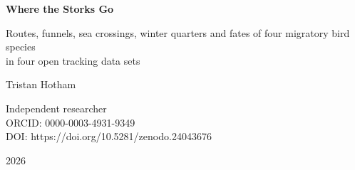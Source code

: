 \documentclass[11pt,a4paper]{article}
\begin{document}
\begin{center}
{\Large\bfseries Where the Storks Go\par}
\vspace{0.4em}
{\large Routes, funnels, sea crossings, winter quarters and fates of four migratory bird species\\in four open tracking data sets\par}
\vspace{1.2em}
{\large Tristan Hotham\par}
\vspace{0.3em}
{\small Independent researcher\\
ORCID: 0000-0003-4931-9349\\
DOI: https://doi.org/10.5281/zenodo.24043676\par}
\vspace{0.8em}
2026
\end{center}
\end{document}
